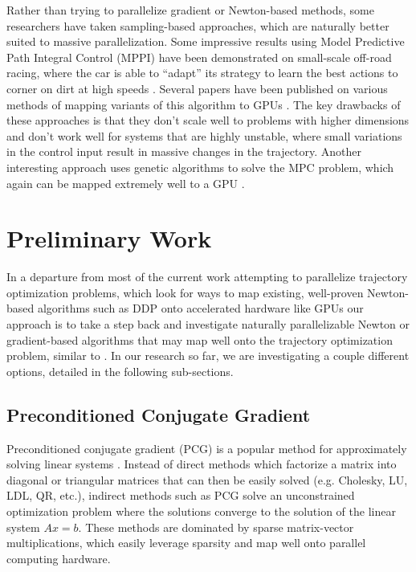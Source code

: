 \documentclass[../root.tex]{subfiles}
\begin{document}
Rather than trying to parallelize gradient or Newton-based methods, some researchers 
have taken sampling-based approaches, which are naturally better suited to 
massive parallelization. Some impressive results using Model Predictive Path Integral 
Control (MPPI) have been demonstrated on small-scale off-road racing, where the 
car is able to ``adapt'' its strategy to learn the best actions to corner on dirt at 
high speeds \cite{williams_Aggressive_2016}. Several papers have been published on 
various methods of mapping variants of this algorithm to GPUs 
\cite{williams_Model_2015,phung_Model_2017}. The key drawbacks of these approaches 
is that they don't scale well to problems with higher dimensions and don't work 
well for systems that are highly unstable, where small variations in the control input 
result in massive changes in the trajectory. Another interesting approach uses genetic 
algorithms to solve the MPC problem, which again can be mapped extremely well to a GPU 
\cite{hyatt_Realtime_2017,hyatt_RealTime_2020}. 


\section{Preliminary Work}

In a departure from most of the current work attempting to parallelize
trajectory optimization problems, which look for ways to map existing,
well-proven Newton-based algorithms such as DDP onto accelerated hardware
like GPUs \cite{plancher_Performance_2020, giftthaler_Family_2017} our
approach is to take a step back and investigate naturally parallelizable
Newton or gradient-based algorithms that may map well onto the trajectory
optimization problem, similar to \cite{alonso_Effective_2021,
pan_GPUbased_2019}. In our research so far, we are investigating a couple
different options, detailed in the following sub-sections.

\subsection{Preconditioned Conjugate Gradient}
Preconditioned conjugate gradient (PCG) is a popular method for approximately
solving linear systems \cite{nocedal_Numerical_2006}. Instead of direct methods
which factorize a matrix into diagonal or triangular matrices that can then 
be easily solved (e.g. Cholesky, LU, LDL, QR, etc.), indirect methods such as
PCG solve an unconstrained optimization problem where the solutions 
converge to the solution of the linear system $Ax = b$. 
These methods are dominated by 
sparse matrix-vector multiplications, which easily leverage sparsity and 
map well onto parallel computing hardware. 
\end{document}
